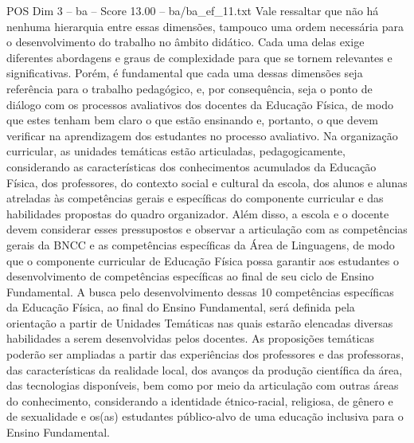 \begin{textsample}{POS Dim 3 – ba – Score 13.00 – ba/ba\_ef\_11.txt}
Vale ressaltar que não há nenhuma hierarquia entre essas dimensões, tampouco uma ordem necessária para o desenvolvimento do trabalho no âmbito didático.
Cada uma delas exige diferentes abordagens e graus de complexidade para que se tornem relevantes e significativas.
Porém, é fundamental que cada uma dessas dimensões seja referência para o trabalho pedagógico, e, por consequência, seja o ponto de diálogo com os processos avaliativos dos docentes da Educação Física, de modo que estes tenham bem claro o que estão ensinando e, portanto, o que devem verificar na aprendizagem dos estudantes no processo avaliativo.
Na organização curricular, as unidades temáticas estão articuladas, pedagogicamente, considerando as características dos conhecimentos acumulados da Educação Física, dos professores, do contexto social e cultural da escola, dos alunos e alunas atreladas às competências gerais e específicas do componente curricular e das habilidades propostas do quadro organizador.
Além disso, a escola e o docente devem considerar esses pressupostos e observar a articulação com as competências gerais da BNCC e as competências específicas da Área de Linguagens, de modo que o componente curricular de Educação Física possa garantir aos estudantes o desenvolvimento de competências específicas ao final de seu ciclo de Ensino Fundamental.
A busca pelo desenvolvimento dessas 10 competências específicas da Educação Física, ao final do Ensino Fundamental, será definida pela orientação a partir de Unidades Temáticas nas quais estarão elencadas diversas habilidades a serem desenvolvidas pelos docentes.
As proposições temáticas poderão ser ampliadas a partir das experiências dos professores e das professoras, das características da realidade local, dos avanços da produção científica da área, das tecnologias disponíveis, bem como por meio da articulação com outras áreas do conhecimento, considerando a identidade étnico-racial, religiosa, de gênero e de sexualidade e os(as) estudantes público-alvo de uma educação inclusiva para o Ensino Fundamental.

\end{textsample}
